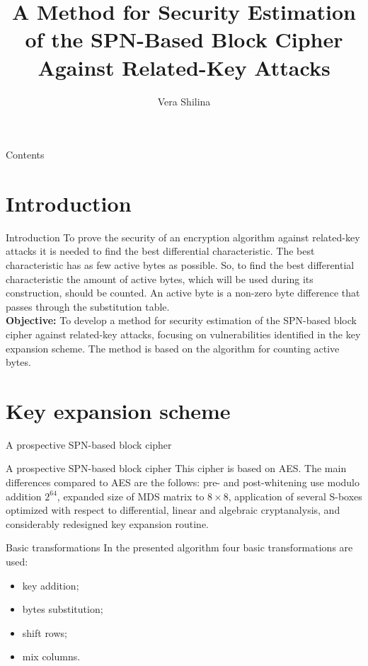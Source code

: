 \documentclass[10pt]{beamer}
\title{A Method for Security Estimation of the SPN-Based Block Cipher Against Related-Key Attacks}
\author{Vera Shilina}
\institute{Samara University}
\date{}
\begin{document}
\begin{frame}
\titlepage
\end{frame}

\begin{frame}{Contents}
\tableofcontents
\end{frame}

\section{Introduction}

\begin{frame}{Introduction}
To prove the security of an encryption algorithm against related-key attacks it is needed to find the \alert{best differential characteristic}. The best characteristic has as few active bytes as possible. So, to find the \alert{best differential characteristic} the amount of active bytes, which will be used during its construction, should be counted. An active byte is a non-zero byte difference that passes through the substitution table. \\
\textbf{Objective:} To develop a method for security estimation of the SPN-based block cipher against related-key attacks, focusing on vulnerabilities identified in the key expansion scheme. The method is based on the algorithm for counting active bytes.
\end{frame}

\section{Key expansion scheme}

\begin{frame}{A prospective SPN-based block cipher}
\begin{block}{A prospective SPN-based block cipher}
This cipher is based on AES. The main differences compared to AES are the follows: pre- and post-whitening use modulo addition $2^{64}$, expanded size of MDS matrix to $8 \times 8$, application of several S-boxes optimized with respect to differential, linear and algebraic cryptanalysis, and considerably redesigned key expansion routine.
\end{block}
\end{frame}

\begin{frame}{Basic transformations}
In the presented algorithm four basic transformations are used:
\begin{itemize}
    \item<1-> key addition;
    \item<2-> bytes substitution;
    \item<3-> shift rows;
    \item<4-> mix columns.
\end{itemize}
\end{frame}
\end{document}
